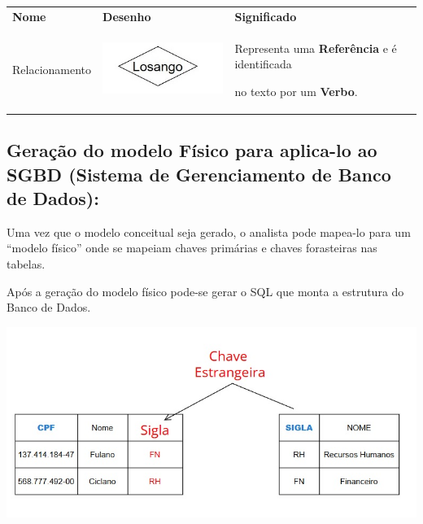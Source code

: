 \documentclass[
]{book}
\begin{document}
\begin{longtable}[]{@{}
  >{\centering\arraybackslash}p{}
  >{\centering\arraybackslash}p{}
  >{\centering\arraybackslash}p{}@{}}
\toprule\noalign{}
\endhead
\bottomrule\noalign{}
\endlastfoot
\textbf{Nome} & \textbf{Desenho} & \textbf{Significado} \\
Relacionamento & \includegraphics[width=1.92708in,height=\textheight]{images/5-bi/04-losango.jpg} & Representa uma \textbf{Referência} e é identificada

no texto por um \textbf{Verbo}. \\
\end{longtable}

\subsection{Geração do modelo Físico para aplica-lo ao SGBD (Sistema de Gerenciamento de Banco de Dados):}\label{gerauxe7uxe3o-do-modelo-fuxedsico-para-aplica-lo-ao-sgbd-sistema-de-gerenciamento-de-banco-de-dados}

Uma vez que o modelo conceitual seja gerado, o analista pode mapea-lo para um ``modelo físico'' onde se mapeiam chaves primárias e chaves forasteiras nas tabelas.

Após a geração do modelo físico pode-se gerar o SQL que monta a estrutura do Banco de Dados.

\includegraphics{images/5-bi/06-modelo_fisico.jpg}
\end{document}
